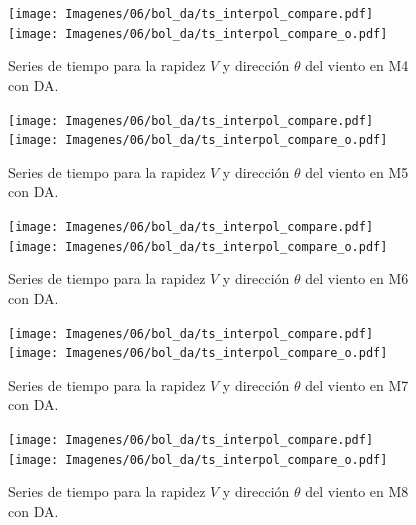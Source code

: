 \begin{figure}[H]
	\centering
	\texttt{[image: Imagenes/06/bol\_da/ts\_interpol\_compare.pdf]}\\%
	\texttt{[image: Imagenes/06/bol\_da/ts\_interpol\_compare\_o.pdf]}%
	\vspace{-2mm}\caption{Series de tiempo para la rapidez $V$ y dirección $\theta$ del viento en M4 con DA.}
	\label{fig:06_bol_da_ts_m4}
\end{figure}

\begin{figure}[H]
	\centering
	\texttt{[image: Imagenes/06/bol\_da/ts\_interpol\_compare.pdf]}\\%
	\texttt{[image: Imagenes/06/bol\_da/ts\_interpol\_compare\_o.pdf]}%
	\vspace{-2mm}\caption{Series de tiempo para la rapidez $V$ y dirección $\theta$ del viento en M5 con DA.}
	\label{fig:06_bol_da_ts_m5}
\end{figure}

\begin{figure}[H]
	\centering
	\texttt{[image: Imagenes/06/bol\_da/ts\_interpol\_compare.pdf]}\\%
	\texttt{[image: Imagenes/06/bol\_da/ts\_interpol\_compare\_o.pdf]}%
	\vspace{-2mm}\caption{Series de tiempo para la rapidez $V$ y dirección $\theta$ del viento en M6 con DA.}
	\label{fig:06_bol_da_ts_m6}
\end{figure}

\begin{figure}[H]
	\centering
	\texttt{[image: Imagenes/06/bol\_da/ts\_interpol\_compare.pdf]}\\%
	\texttt{[image: Imagenes/06/bol\_da/ts\_interpol\_compare\_o.pdf]}%
	\vspace{-2mm}\caption{Series de tiempo para la rapidez $V$ y dirección $\theta$ del viento en M7 con DA.}
	\label{fig:06_bol_da_ts_m7}
\end{figure}

\begin{figure}[H]
	\centering
	\texttt{[image: Imagenes/06/bol\_da/ts\_interpol\_compare.pdf]}\\%
	\texttt{[image: Imagenes/06/bol\_da/ts\_interpol\_compare\_o.pdf]}%
	\vspace{-2mm}\caption{Series de tiempo para la rapidez $V$ y dirección $\theta$ del viento en M8 con DA.}
	\label{fig:06_bol_da_ts_m8}
\end{figure}
